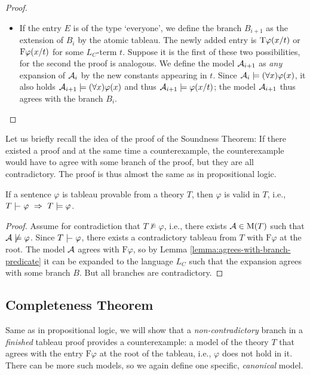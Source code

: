 \begin{proof}
\begin{itemize}
\begin{itemize}
            \item If the entry $E$ is of the type `everyone', we define the branch $B_{i+1}$ as the extension of $B_i$ by the atomic tableau. The newly added entry is $\mathrm{T}\varphi(x/t)$ or $\mathrm{F}\varphi(x/t)$ for some $L_C$-term $t$. Suppose it is the first of these two possibilities, for the second the proof is analogous. 
            We define the model $\mathcal{A}_{i+1}$ as \emph{any} expansion of $\mathcal{A}_i$ by the new constants appearing in $t$.    
            Since $\mathcal{A}_i\models(\forall x)\varphi(x)$, it also holds $\mathcal{A}_{i+1}\models(\forall x)\varphi(x)$ and thus $\mathcal{A}_{i+1}\models\varphi(x/t)$; the model $\mathcal{A}_{i+1}$ thus agrees with the branch $B_i$.
        \end{itemize}       
    \end{itemize}
\end{proof}

Let us briefly recall the idea of the proof of the Soundness Theorem: If there existed a proof and at the same time a counterexample, the counterexample would have to agree with some branch of the proof, but they are all contradictory. The proof is thus almost the same as in propositional logic.

\begin{theorem}[On Soundness]
If a sentence $\varphi$ is tableau provable from a theory $T$, then $\varphi$ is valid in $T$, i.e., $T\proves\varphi\ \Rightarrow\ T\models\varphi$.    
\end{theorem}

\begin{proof}
Assume for contradiction that $T\not\models\varphi$, i.e., there exists $\mathcal{A}\in\operatorname{M}(T)$ such that $\mathcal{A}\not\models\varphi$. Since $T\proves\varphi$, there exists a contradictory tableau from $T$ with $\mathrm{F}\varphi$ at the root. The model $\mathcal{A}$ agrees with $\mathrm{F}\varphi$, so by Lemma \ref{lemma:agrees-with-branch-predicate} it can be expanded to the language $L_C$ such that the expansion agrees with some branch $B$. But all branches are contradictory.
\end{proof}


\subsection{Completeness Theorem}

Same as in propositional logic, we will show that a \emph{non-contradictory} branch in a \emph{finished} tableau proof provides a counterexample: a model of the theory $T$ that agrees with the entry $\mathrm{F}\varphi$ at the root of the tableau, i.e., $\varphi$ does not hold in it. There can be more such models, so we again define one specific, \emph{canonical} model.

